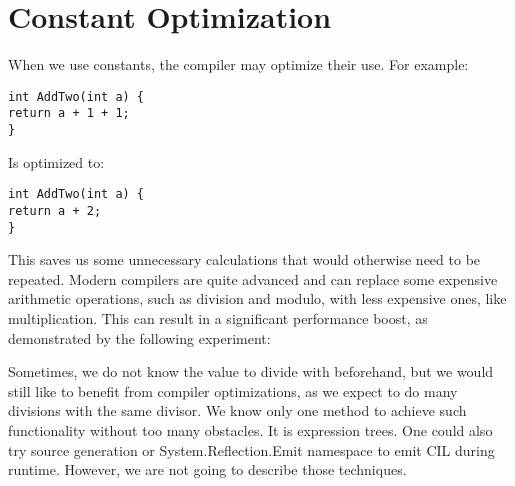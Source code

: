 \section{Constant Optimization}
When we use constants, the compiler may optimize their use. For example:

\begin{lstlisting}
int AddTwo(int a) {
return a + 1 + 1;
}
\end{lstlisting}

Is optimized to:

\begin{lstlisting}
int AddTwo(int a) {
return a + 2;
}
\end{lstlisting}

This saves us some unnecessary calculations that would otherwise need to be repeated. Modern compilers are quite advanced and can replace some expensive arithmetic operations, such as division and modulo, with less expensive ones, like multiplication. This can result in a significant performance boost, as demonstrated by the following experiment:

Sometimes, we do not know the value to divide with beforehand, but we would still like to benefit from compiler optimizations, as we expect to do many divisions with the same divisor. We know only one method to achieve such functionality without too many obstacles. It is expression trees. One could also try source generation or System.Reflection.Emit namespace to emit CIL during runtime. However, we are not going to describe those techniques.
